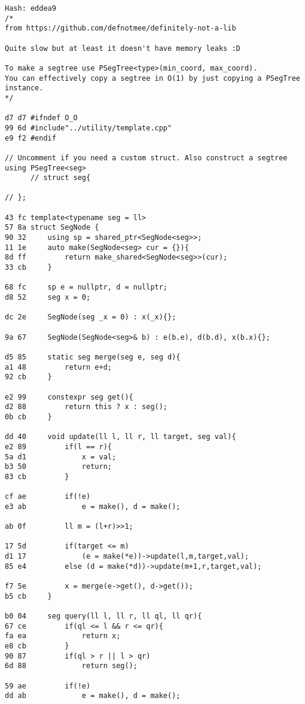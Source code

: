 \documentclass[11pt, a4paper, twoside]{article}
\begin{document}
\begin{lstlisting}
Hash: eddea9
/*
from https://github.com/defnotmee/definitely-not-a-lib

Quite slow but at least it doesn't have memory leaks :D

To make a segtree use PSegTree<type>(min_coord, max_coord).
You can effectively copy a segtree in O(1) by just copying a PSegTree instance.
*/
 
d7 d7 #ifndef O_O
99 6d #include"../utility/template.cpp"
e9 f2 #endif
 
// Uncomment if you need a custom struct. Also construct a segtree using PSegTree<seg>
      // struct seg{
       
// };
 
43 fc template<typename seg = ll>
57 8a struct SegNode {
90 32     using sp = shared_ptr<SegNode<seg>>;
11 1e     auto make(SegNode<seg> cur = {}){
8d ff         return make_shared<SegNode<seg>>(cur);
33 cb     }
      
68 fc     sp e = nullptr, d = nullptr;
d8 52     seg x = 0;
          
dc 2e     SegNode(seg _x = 0) : x(_x){};
       
9a 67     SegNode(SegNode<seg>& b) : e(b.e), d(b.d), x(b.x){};
      
d5 85     static seg merge(seg e, seg d){
a1 48         return e+d; 
92 cb     }
          
e2 99     constexpr seg get(){
d2 88         return this ? x : seg();
0b cb     }
      
dd 40     void update(ll l, ll r, ll target, seg val){
e2 89         if(l == r){ 
5a d1             x = val;
b3 50             return;
83 cb         }
      
cf ae         if(!e)
e3 ab             e = make(), d = make();
      
ab 0f         ll m = (l+r)>>1;
       
17 5d         if(target <= m)
d1 17             (e = make(*e))->update(l,m,target,val);
85 e4         else (d = make(*d))->update(m+1,r,target,val);
      
f7 5e         x = merge(e->get(), d->get());
b5 cb     }
       
b0 04     seg query(ll l, ll r, ll ql, ll qr){
67 ce         if(ql <= l && r <= qr){
fa ea             return x;
e8 cb         }
90 87         if(ql > r || l > qr)
6d 88             return seg();
              
59 ae         if(!e)
dd ab             e = make(), d = make();
              

\end{lstlisting}
\end{document}
